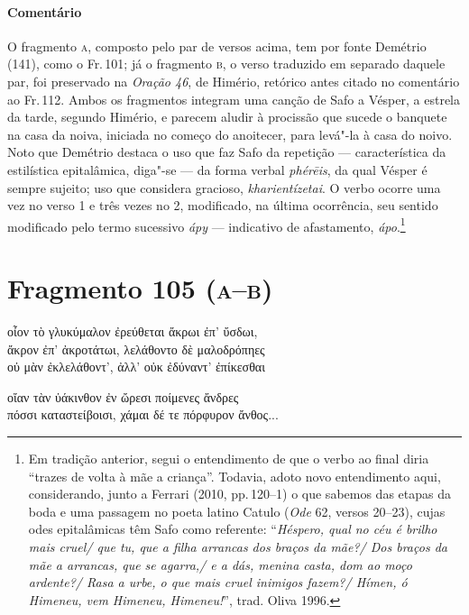 {\paragraph{Comentário} O fragmento \textsc{a}, composto pelo par de versos acima, tem por fonte Demétrio (141),
como o Fr.\,101; já o fragmento \textsc{b}, o verso traduzido em separado daquele par,
foi preservado na \emph{Oração 46}, de Himério, retórico antes citado no comentário ao Fr.\,112.
Ambos os fragmentos integram uma canção de Safo a Vésper, a estrela da tarde,
segundo Himério, e parecem aludir à procissão que sucede o banquete na casa da
noiva, iniciada no começo do anoitecer, para levá"-la à casa do noivo.
Noto que Demétrio destaca o uso que faz Safo da repetição --- característica da estilística epitalâmica, diga"-se --- da forma verbal \emph{phérēis}, da qual Vésper é sempre sujeito; uso que considera gracioso, \emph{kharientízetai}. O verbo ocorre uma vez no verso 1 e três vezes no 2, modificado, na última ocorrência, seu sentido modificado pelo termo sucessivo \emph{ápy} --- indicativo de afastamento, \emph{ápo}.\footnote{Em tradição anterior, segui o entendimento de que o verbo ao final diria ``trazes de volta à mãe a criança''. Todavia, adoto novo entendimento aqui, considerando, junto a Ferrari (2010, pp.\,120--1) o que sabemos das etapas da boda e uma passagem no poeta latino Catulo (\emph{Ode} 62, versos 20--23), cujas odes epitalâmicas têm Safo como referente: ``\emph{Héspero, qual no céu é brilho mais cruel/ que tu, que a filha arrancas dos braços da mãe?/ Dos braços da mãe a arrancas, que se agarra,/ e a dás, menina casta, dom ao moço ardente?/ Rasa a urbe, o que mais cruel inimigos fazem?/ Hímen, ó Himeneu, vem Himeneu, Himeneu!}'', trad. Oliva 1996.} }

\section{Fragmento 105 (\textsc{a--b})}

\begin{gkverse}
οἶον τὸ γλυκύμαλον ἐρεύθεται ἄκρωι ἐπ’ ὔσδωι,\\
ἄκρον ἐπ’ ἀκροτάτωι, λελάθοντο δὲ μαλοδρόπηες\\
οὐ μὰν ἐκλελάθοντ’, ἀλλ’ οὐκ ἐδύναντ’ ἐπίκεσθαι\\ 

  \medskip 

\hspace*{35mm}{\minion [...]}

οἴαν τὰν ὐάκινθον ἐν ὤρεσι ποίμενες ἄνδρες\\
πόσσι καταστείβοισι, χάμαι δέ τε πόρφυρον ἄνθος...

\end{gkverse}

